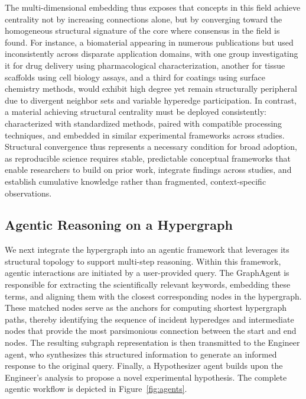 \documentclass{article}
\begin{document}
The multi-dimensional embedding thus exposes that concepts in this field achieve centrality not by increasing connections alone, but by converging toward the homogeneous structural signature of the core where consensus in the field is found. For instance, a biomaterial appearing in numerous publications but used inconsistently across disparate application domains, with one group investigating it for drug delivery using pharmacological characterization, another for tissue scaffolds using cell biology assays, and a third for coatings using surface chemistry methods, would exhibit high degree yet remain structurally peripheral due to divergent neighbor sets and variable hyperedge participation. In contrast, a material achieving structural centrality must be deployed consistently: characterized with standardized methods, paired with compatible processing techniques, and embedded in similar experimental frameworks across studies. Structural convergence thus represents a necessary condition for broad adoption, as reproducible science requires stable, predictable conceptual frameworks that enable researchers to build on prior work, integrate findings across studies, and establish cumulative knowledge rather than fragmented, context-specific observations.


\subsection{Agentic Reasoning on a Hypergraph}\label{sec5}

We next integrate the hypergraph into an agentic framework that leverages its structural topology to support multi-step reasoning. Within this framework, agentic interactions are initiated by a user-provided query. The GraphAgent is responsible for extracting the scientifically relevant keywords, embedding these terms, and aligning them with the closest corresponding nodes in the hypergraph. These matched nodes serve as the anchors for computing shortest hypergraph paths, thereby identifying the sequence of incident hyperedges and intermediate nodes that provide the most parsimonious connection between the start and end nodes. The resulting subgraph representation is then transmitted to the Engineer agent, who synthesizes this structured information to generate an informed response to the original query. Finally, a Hypothesizer agent builds upon the Engineer’s analysis to propose a novel experimental hypothesis. The complete agentic workflow is depicted in Figure~\ref{fig:agents}.
\end{document}
